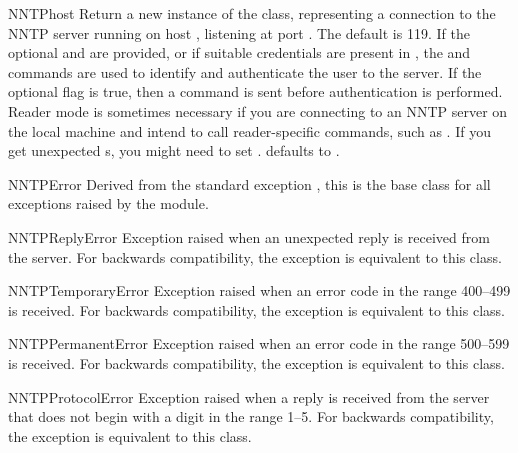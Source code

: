 \begin{classdesc}{NNTP}{host}
Return a new instance of the  class, representing a
connection to the NNTP server running on host , listening at
port .  The default  is 119.  If the optional
 and  are provided, 
or if suitable credentials are present in ,
the  and  commands are used to
identify and authenticate the user to the server.  If the optional
flag  is true, then a  command is
sent before authentication is performed.  Reader mode is sometimes
necessary if you are connecting to an NNTP server on the local machine
and intend to call reader-specific commands, such as .  If
you get unexpected s, you might need to set
.   defaults to .
\end{classdesc}

\begin{classdesc}{NNTPError}{}
Derived from the standard exception , this is the base
class for all exceptions raised by the  module.
\end{classdesc}

\begin{classdesc}{NNTPReplyError}{}
Exception raised when an unexpected reply is received from the
server.  For backwards compatibility, the exception 
is equivalent to this class.
\end{classdesc}

\begin{classdesc}{NNTPTemporaryError}{}
Exception raised when an error code in the range 400--499 is
received.  For backwards compatibility, the exception
 is equivalent to this class.
\end{classdesc}

\begin{classdesc}{NNTPPermanentError}{}
Exception raised when an error code in the range 500--599 is
received.  For backwards compatibility, the exception
 is equivalent to this class.
\end{classdesc}

\begin{classdesc}{NNTPProtocolError}{}
Exception raised when a reply is received from the server that does
not begin with a digit in the range 1--5.  For backwards
compatibility, the exception  is equivalent to this
class.
\end{classdesc}

